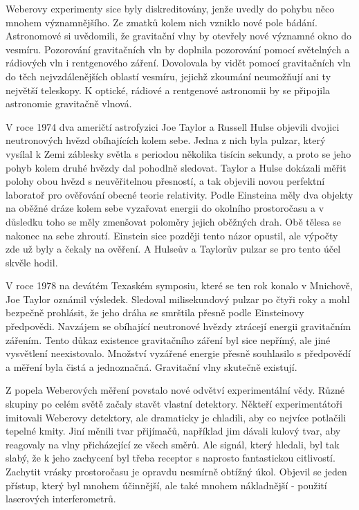   Weberovy experimenty sice byly diskreditovány, jenže uvedly do pohybu něco mnohem významnějšího.
  Ze zmatků kolem nich vzniklo nové pole bádání. Astronomové si uvědomili, že gravitační vlny by
  otevřely nové významné okno do vesmíru. Pozorování gravitačních vln by doplnila pozorování pomocí
  světelných a rádiových vln i rentgenového záření. Dovolovala by vidět pomocí gravitačních vln do
  těch nejvzdálenějších oblastí vesmíru, jejichž zkoumání neumožňují ani ty největší teleskopy. K
  optické, rádiové a rentgenové astronomii by se připojila astronomie gravitačně vlnová. 

  V roce 1974 dva američtí astrofyzici Joe Taylor a Russell Hulse objevili dvojici neutronových
  hvězd obíhajících kolem sebe. Jedna z nich byla pulzar, který vysílal k Zemi záblesky světla s
  periodou několika tisícin sekundy, a proto se jeho pohyb kolem druhé hvězdy dal pohodlně sledovat.
  Taylor a Hulse dokázali měřit polohy obou hvězd s neuvěřitelnou přesností, a tak objevili novou
  perfektní laboratoř pro ověřování obecné teorie relativity. Podle Einsteina měly dva objekty na
  oběžné dráze kolem sebe vyzařovat energii do okolního prostoročasu a v důsledku toho se měly
  zmenšovat poloměry jejich oběžných drah. Obě tělesa se nakonec na sebe zhroutí. Einstein sice
  později tento názor opustil, ale výpočty zde už byly a čekaly na ověření. A Hulseův a Taylorův
  pulzar se pro tento účel skvěle hodil. 

  V roce 1978 na devátém Texaském symposiu, které se ten rok konalo v Mnichově, Joe Taylor oznámil
  výsledek. Sledoval milisekundový pulzar po čtyři roky a mohl bezpečně prohlásit, že jeho dráha se
  smrštila přesně podle Einsteinovy předpovědi. Navzájem se obíhající neutronové hvězdy ztrácejí
  energii gravitačním zářením. Tento důkaz existence gravitačního záření byl sice nepřímý, ale jiné
  vysvětlení neexistovalo. Množství vyzářené energie přesně souhlasilo s předpovědí a měření byla
  čistá a jednoznačná. Gravitační vlny skutečně existují. 

  Z popela Weberových měření povstalo nové odvětví experimentální vědy. Různé skupiny po celém světě
  začaly stavět vlastní detektory. Někteří experimentátoři imitovali Weberovy detektory, ale
  dramaticky je chladili, aby co nejvíce potlačili tepelné kmity. Jiní měnili tvar přijímačů,
  například jim dávali kulový tvar, aby reagovaly na vlny přicházející ze všech směrů. Ale signál,
  který hledali, byl tak slabý, že k jeho zachycení byl třeba receptor s naprosto fantastickou
  citlivostí. Zachytit vrásky prostoročasu je opravdu nesmírně obtížný úkol. Objevil se jeden
  přístup, který byl mnohem účinnější, ale také mnohem nákladnější - použití laserových
  interferometrů. 

